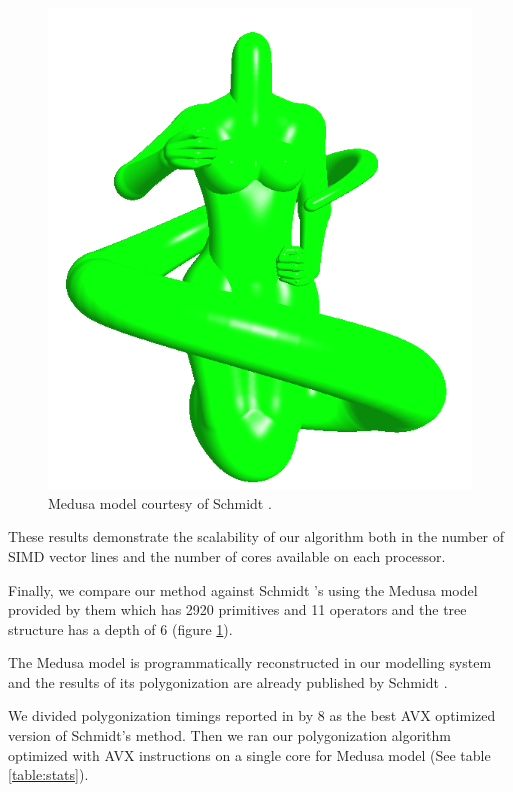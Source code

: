 \begin{figure}[htb]
  \centering
  \includegraphics[width=0.7\linewidth]{figures/cpupoly/medusa}
  \caption{\label{fig:ModelMedusa}
  {Medusa model courtesy of Schmidt \etal \cite{SWG2005}.}
}
\end{figure}

These results demonstrate the scalability of our algorithm both in the number of SIMD vector lines and 
the number of cores available on each processor. 

Finally, we compare our method against Schmidt \etal's \cite{SWG2005} using the Medusa model provided by them   
which has 2920 primitives and 11 operators and the tree structure has a depth of 6 (figure \ref{fig:ModelMedusa}).

The Medusa model is programmatically reconstructed in our modelling system and the results of its 
polygonization are already published by Schmidt \etal \cite{SWG2005}. 


We divided polygonization timings reported in \cite{SWG2005} by 8 as the best AVX
optimized version of Schmidt's method. Then we ran our polygonization algorithm
optimized with AVX instructions on a single core for Medusa model (See table \ref{table:stats}). 



